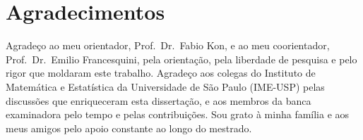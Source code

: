 \frontmatter

\pagestyle{plain}

\onehalfspacing %

\maketitle %


%

\chapter*{Agradecimentos}

Agradeço ao meu orientador, Prof.\ Dr.\ Fabio Kon, e ao meu coorientador, Prof.\ Dr.\ Emilio Francesquini, pela orientação, pela
liberdade de pesquisa e pelo rigor que moldaram este trabalho. Agradeço aos
colegas do Instituto de Matemática e Estatística da Universidade de São Paulo
(IME-USP) pelas discussões que enriqueceram esta dissertação, e aos membros da
banca examinadora pelo tempo e pelas contribuições. Sou grato à minha família e
aos meus amigos pelo apoio constante ao longo do mestrado.

%

%

